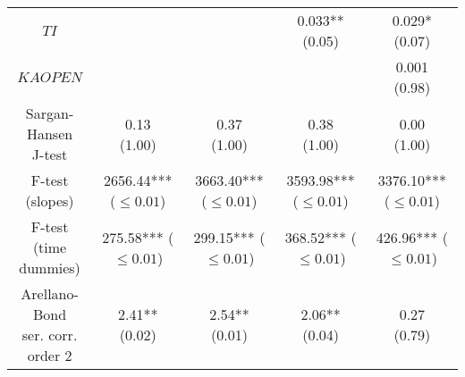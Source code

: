 \begin{tabular}{ccccc}
                                          $TI$ &                                       &                                       &            \makecell{0.033**\\(0.05)} &             \makecell{0.029*\\(0.07)} \\
                                      $KAOPEN$ &                                       &                                       &                                       &              \makecell{0.001\\(0.98)} \\
              \makecell{Sargan-Hansen\\J-test} &               \makecell{0.13\\(1.00)} &               \makecell{0.37\\(1.00)} &               \makecell{0.38\\(1.00)} &               \makecell{0.00\\(1.00)} \\
                   \makecell{F-test\\(slopes)} &  \makecell{2656.44***\\($\leq 0.01$)} &  \makecell{3663.40***\\($\leq 0.01$)} &  \makecell{3593.98***\\($\leq 0.01$)} &  \makecell{3376.10***\\($\leq 0.01$)} \\
             \makecell{F-test\\(time dummies)} &   \makecell{275.58***\\($\leq 0.01$)} &   \makecell{299.15***\\($\leq 0.01$)} &   \makecell{368.52***\\($\leq 0.01$)} &   \makecell{426.96***\\($\leq 0.01$)} \\
 \makecell{Arellano-Bond\\ser. corr.  order 2} &             \makecell{2.41**\\(0.02)} &             \makecell{2.54**\\(0.01)} &             \makecell{2.06**\\(0.04)} &               \makecell{0.27\\(0.79)} \\
\bottomrule
\end{tabular}

